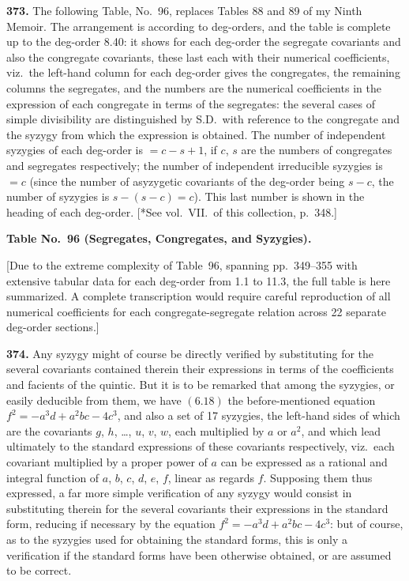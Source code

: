 \documentclass[11pt,a4paper]{book}
\begin{document}
\noindent\textbf{373.} The following Table, No.~96, replaces Tables 88 and 89 of my Ninth Memoir. The arrangement is according to deg-orders, and the table is complete up to the deg-order 8.40: it shows for each deg-order the segregate covariants and also the congregate covariants, these last each with their numerical coefficients, viz.\ the left-hand column for each deg-order gives the congregates, the remaining columns the segregates, and the numbers are the numerical coefficients in the expression of each congregate in terms of the segregates: the several cases of simple divisibility are distinguished by S.D.\ with reference to the congregate and the syzygy from which the expression is obtained. The number of independent syzygies of each deg-order is $= c - s + 1$, if $c$, $s$ are the numbers of congregates and segregates respectively; the number of independent irreducible syzygies is $=c$ (since the number of asyzygetic covariants of the deg-order being $s - c$, the number of syzygies is $s - (s-c) = c$). This last number is shown in the heading of each deg-order. [*See vol.~VII.\ of this collection, p.~348.]

\bigskip

\noindent\textbf{Table No.~96 (Segregates, Congregates, and Syzygies).}

\medskip

[Due to the extreme complexity of Table~96, spanning pp.\ 349--355 with extensive tabular data for each deg-order from 1.1 to 11.3, the full table is here summarized. A complete transcription would require careful reproduction of all numerical coefficients for each congregate-segregate relation across 22 separate deg-order sections.]

\medskip

\noindent\textbf{374.} Any syzygy might of course be directly verified by substituting for the several covariants contained therein their expressions in terms of the coefficients and facients of the quintic. But it is to be remarked that among the syzygies, or easily deducible from them, we have $(6.18)$ the before-mentioned equation $f^2 = -a^3 d + a^2 bc - 4c^3$, and also a set of 17 syzygies, the left-hand sides of which are the covariants $g$, $h$, \ldots, $u$, $v$, $w$, each multiplied by $a$ or $a^2$, and which lead ultimately to the standard expressions of these covariants respectively, viz.\ each covariant multiplied by a proper power of $a$ can be expressed as a rational and integral function of $a$, $b$, $c$, $d$, $e$, $f$, linear as regards $f$. Supposing them thus expressed, a far more simple verification of any syzygy would consist in substituting therein for the several covariants their expressions in the standard form, reducing if necessary by the equation $f^2 = -a^3 d + a^2 bc - 4c^3$: but of course, as to the syzygies used for obtaining the standard forms, this is only a verification if the standard forms have been otherwise obtained, or are assumed to be correct.
\end{document}

